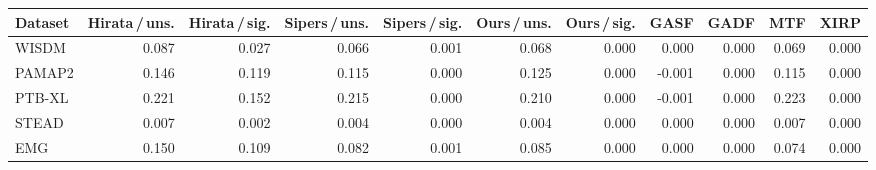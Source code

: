 \begin{tabular}{@{}lrrrrrrrrrr@{}}
\toprule
Dataset & Hirata\,/\,uns. & Hirata\,/\,sig. & Sipers\,/\,uns. & Sipers\,/\,sig. & Ours\,/\,uns. & Ours\,/\,sig. & GASF & GADF & MTF & XIRP \\
\midrule
WISDM & 0.087 & 0.027 & 0.066 & 0.001 & 0.068 & 0.000 & 0.000 & 0.000 & 0.069 & 0.000 \\
PAMAP2 & 0.146 & 0.119 & 0.115 & 0.000 & 0.125 & 0.000 & -0.001 & 0.000 & 0.115 & 0.000 \\
PTB-XL & 0.221 & 0.152 & 0.215 & 0.000 & 0.210 & 0.000 & -0.001 & 0.000 & 0.223 & 0.000 \\
STEAD & 0.007 & 0.002 & 0.004 & 0.000 & 0.004 & 0.000 & 0.000 & 0.000 & 0.007 & 0.000 \\
EMG & 0.150 & 0.109 & 0.082 & 0.001 & 0.085 & 0.000 & 0.000 & 0.000 & 0.074 & 0.000 \\
\bottomrule
\end{tabular}
